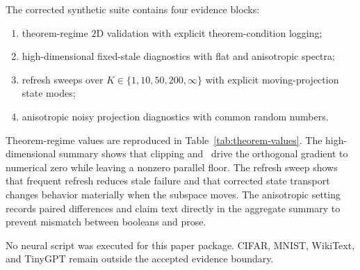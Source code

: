 The corrected synthetic suite contains four evidence blocks:
\begin{enumerate}[leftmargin=1.5em]
\item theorem-regime $2$D validation with explicit theorem-condition logging;
\item high-dimensional fixed-stale diagnostics with flat and anisotropic
spectra;
\item refresh sweeps over $K\in\{1,10,50,200,\infty\}$ with explicit
moving-projection state modes;
\item anisotropic noisy projection diagnostics with common random numbers.
\end{enumerate}

Theorem-regime values are reproduced in Table~\ref{tab:theorem-values}. The
high-dimensional summary shows that clipping and \BECR\ drive the orthogonal
gradient to numerical zero while leaving a nonzero parallel floor. The refresh
sweep shows that frequent refresh reduces stale failure and that corrected state
transport changes behavior materially when the subspace moves. The anisotropic
setting records paired differences and claim text directly in the aggregate
summary to prevent mismatch between booleans and prose.

No neural script was executed for this paper package. CIFAR, MNIST, WikiText,
and TinyGPT remain outside the accepted evidence boundary.
